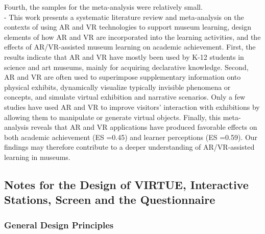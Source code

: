 Fourth, the samples for the meta-analysis were relatively small.
\\
- This work presents a systematic literature review and meta-analysis on the contexts of using AR and VR technologies to support
museum learning, design elements of how AR and VR are incorporated into the learning activities, and the effects of AR/VR-assisted
museum learning on academic achievement. First, the results indicate that AR and VR have mostly been used by K-12 students in
science and art museums, mainly for acquiring declarative knowledge. Second, AR and VR are often used to superimpose supplementary
information onto physical exhibits, dynamically visualize typically invisible phenomena or concepts, and simulate virtual
exhibition and narrative scenarios. Only a few studies have used AR and VR to improve visitors’ interaction with exhibitions by
allowing them to manipulate or generate virtual objects. Finally, this meta-analysis reveals that AR and VR applications have produced
favorable effects on both academic achievement (ES =0.45) and learner perceptions (ES =0.59). Our findings may therefore
contribute to a deeper understanding of AR/VR-assisted learning in museums.
\\
\subsection{Notes for the Design of VIRTUE, Interactive Stations, Screen and the Questionnaire}

\subsubsection{General Design Principles}

